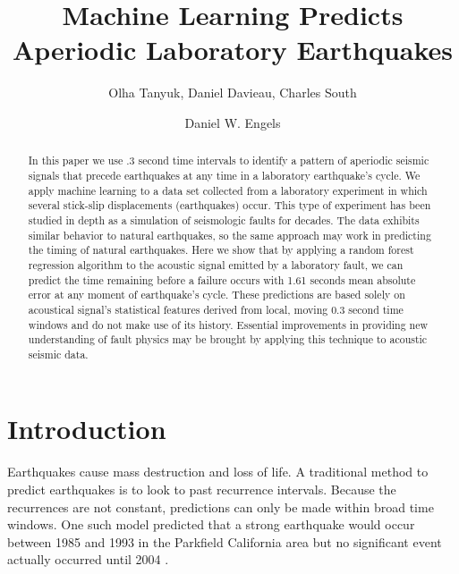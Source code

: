 \documentclass[]{llncs} %
\begin{document}

\title{Machine Learning Predicts Aperiodic Laboratory Earthquakes}
\author{Olha Tanyuk, Daniel Davieau, Charles South \and Daniel W. Engels}


\maketitle
\begin{abstract}
In this paper we use .3 second time intervals to identify a pattern of aperiodic seismic signals that precede earthquakes at any time in a laboratory earthquake’s cycle. We apply machine learning to a data set collected from a laboratory experiment in which several stick-slip displacements (earthquakes) occur. This type of experiment  has been studied in depth as a simulation of seismologic faults for decades. The data exhibits similar behavior to natural earthquakes, so the same approach may work in predicting the timing of natural earthquakes. Here we show that by applying a random forest regression algorithm to the acoustic signal emitted by a laboratory fault, we can predict the time remaining before a failure occurs with 1.61 seconds mean absolute error at any moment of earthquake’s cycle. These predictions are based solely on acoustical signal's statistical features derived from local, moving 0.3 second time windows and do not make use of its history. Essential improvements in providing new understanding of fault physics may be brought by applying this technique to acoustic seismic data.\par
\end{abstract}

\section{Introduction}
Earthquakes cause mass destruction and loss of life. A traditional method to predict earthquakes is to look to past recurrence intervals. Because the recurrences are not constant, predictions can only be made within broad time windows. One such model predicted that a strong earthquake would occur between 1985 and 1993 in the Parkfield California area but no significant event actually occurred until 2004 \cite{Jackson}. \par
\end{document}
